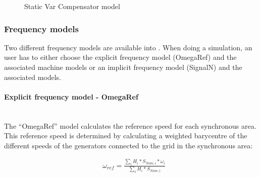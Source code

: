\documentclass[a4paper, 12pt]{report}
\begin{document}
\begin{figure}[h]
  \setlength{\abovecaptionskip}{15pt}
\centering
 \caption{Static Var Compensator model}
 \label{StaticVarCompensator}
\end{figure}

\subsubsection{Frequency models}

Two different frequency models are available into \Dynawo. When doing a simulation, an user has to either choose the explicit frequency model (OmegaRef) and the associated machine models or an implicit frequency model (SignalN) and the associated models.

\paragraph{Explicit frequency model - OmegaRef}
~~\\

The ``OmegaRef'' model calculates the reference speed for each synchronous area. This reference speed is determined by calculating a weighted barycentre of the different speeds of the generators connected to the grid in the synchronous area:

\begin{equation}
\begin{aligned}
& \omega_{ref} = \frac{\sum\limits_{i} H_i * S_{Nom, i} * \omega_{i}}{\sum\limits_{i} H_i * S_{Nom, i}}
\end{aligned}
\label{Speed reference calculation}
\end{equation}
\end{document}
